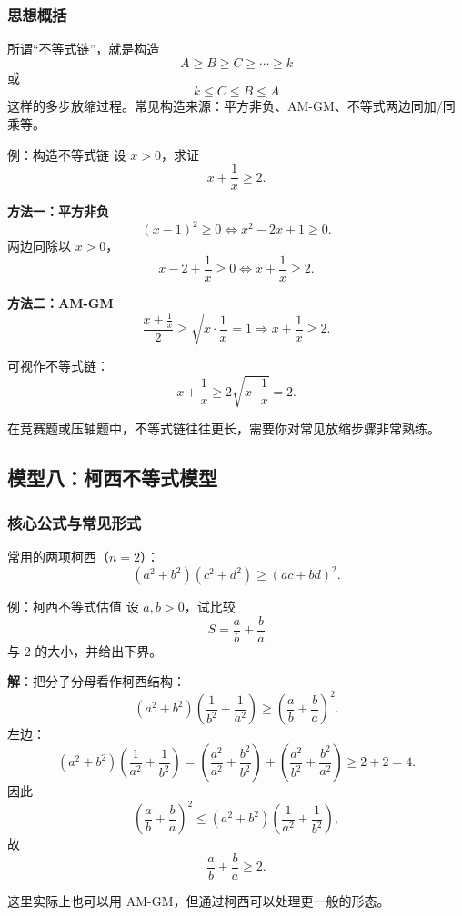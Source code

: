 \documentclass[a4paper,11pt]{ctexart}
\begin{document}
\subsubsection*{思想概括}

所谓“不等式链”，就是构造
\[
A\ge B\ge C\ge\cdots\ge k
\]
或
\[
k\le C\le B\le A
\]
这样的多步放缩过程。常见构造来源：平方非负、AM-GM、不等式两边同加/同乘等。

\begin{examplebox}[mathnote coverage=soft]{例：构造不等式链}
设 $x>0$，求证
\[
x+\frac{1}{x}\ge 2.
\]

\textbf{方法一：平方非负}
\[
(x-1)^2\ge 0\iff x^2-2x+1\ge 0.
\]
两边同除以 $x>0$，
\[
x-2+\frac{1}{x}\ge 0\iff x+\frac{1}{x}\ge 2.
\]

\textbf{方法二：AM-GM}
\[
\frac{x+\frac{1}{x}}{2}\ge\sqrt{x\cdot\frac{1}{x}}=1
\Rightarrow x+\frac{1}{x}\ge 2.
\]

可视作不等式链：
\[
x+\frac{1}{x}\ge 2\sqrt{x\cdot\frac{1}{x}}=2.
\]
\end{examplebox}

在竞赛题或压轴题中，不等式链往往更长，需要你对常见放缩步骤非常熟练。

\subsection{模型八：柯西不等式模型}

\subsubsection*{核心公式与常见形式}

常用的两项柯西（$n=2$）：
\[
(a^2+b^2)(c^2+d^2)\ge(ac+bd)^2.
\]

\begin{examplebox}[mathnote coverage=soft]{例：柯西不等式估值}
设 $a,b>0$，试比较
\[
S=\frac{a}{b}+\frac{b}{a}
\]
与 $2$ 的大小，并给出下界。

\textbf{解}：把分子分母看作柯西结构：
\[
\left(a^2+b^2\right)\left(\frac{1}{b^2}+\frac{1}{a^2}\right)\ge
\left(\frac{a}{b}+\frac{b}{a}\right)^2.
\]
左边：
\[
\left(a^2+b^2\right)\left(\frac{1}{a^2}+\frac{1}{b^2}\right)
=\left(\frac{a^2}{a^2}+\frac{b^2}{b^2}\right)
+\left(\frac{a^2}{b^2}+\frac{b^2}{a^2}\right)\ge 2+2=4.
\]
因此
\[
\left(\frac{a}{b}+\frac{b}{a}\right)^2\le\left(a^2+b^2\right)\left(\frac{1}{a^2}+\frac{1}{b^2}\right),
\]
故
\[
\frac{a}{b}+\frac{b}{a}\ge 2.
\]

这里实际上也可以用 AM-GM，但通过柯西可以处理更一般的形态。
\end{examplebox}
\end{document}
